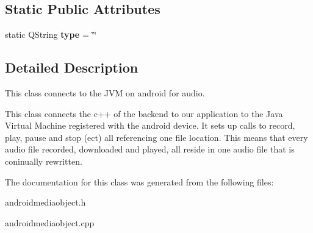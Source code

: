 \subsection*{Static Public Attributes}
\begin{DoxyCompactItemize}
\item 
\hypertarget{classAndroidMediaObject_a6c77676da18dedc844839d48b63f1298}{static Q\-String {\bfseries type} = \char`\"{}\char`\"{}}\label{classAndroidMediaObject_a6c77676da18dedc844839d48b63f1298}

\end{DoxyCompactItemize}


\subsection{Detailed Description}
This class connects to the J\-V\-M on android for audio. 

This class connects the c++ of the backend to our application to the Java Virtual Machine registered with the android device. It sets up calls to record, play, pause and stop (ect) all referencing one file location. This means that every audio file recorded, downloaded and played, all reside in one audio file that is coninually rewritten. 

The documentation for this class was generated from the following files\-:\begin{DoxyCompactItemize}
\item 
androidmediaobject.\-h\item 
androidmediaobject.\-cpp\end{DoxyCompactItemize}
